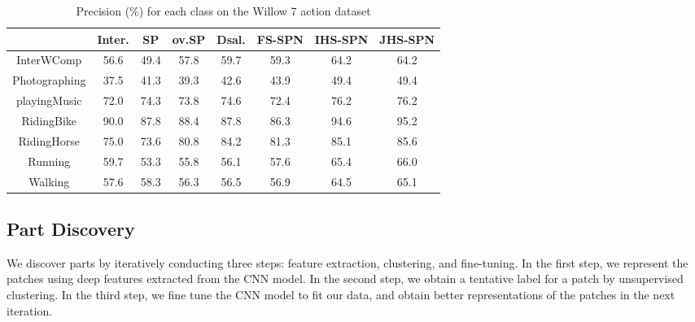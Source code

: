\documentclass[journal]{IEEEtran}
\begin{document}
\begin{table*}[htb]
    \caption{Precision (\%) for each class on the Willow 7 action dataset}   
        
    \begin{center}
        
        \begin{tabular}{c c c c c c c c}
            \hline                        
            \hline
             & Inter.\cite{Delaitre11learningperson-object} &  SP\cite{Lazebnik_beyond_cvpr2006} & ov.SP\cite{Lazebnik_beyond_cvpr2006}  & Dsal.\cite{sharma:CVPR2012_Discriminative}  & FS-SPN & IHS-SPN & JHS-SPN \\ \hline
               InterWComp & 56.6 & 49.4 & 57.8 & 59.7 & 59.3 & 64.2 & 64.2\\
            Photographing & 37.5 &  41.3 & 39.3 & 42.6 & 43.9 & 49.4 & 49.4\\
            playingMusic & 72.0 & 74.3 & 73.8 & 74.6 & 72.4 & 76.2 & 76.2\\
            RidingBike & 90.0 & 87.8 & 88.4 & 87.8 & 86.3 & 94.6 & 95.2\\
            RidingHorse & 75.0 & 73.6 & 80.8 & 84.2 & 81.3 & 85.1 & 85.6\\
            Running & 59.7 &  53.3 & 55.8 & 56.1 & 57.6 & 65.4 & 66.0\\
            Walking & 57.6 & 58.3 & 56.3 & 56.5 & 56.9 & 64.5 & 65.1\\
            \hline
                        
                        \hline
       \end{tabular}
        
    \end{center}
    
    
    \label{tab:class_willow_accuracy} 
\end{table*}









\subsection{Part Discovery}

We discover parts by iteratively conducting three steps: feature extraction, clustering, and fine-tuning. In the first step, we represent the patches using deep features extracted from the CNN model. In the second step, we obtain a tentative label for a patch by unsupervised clustering. In the third step, we fine tune the CNN model to fit our data, and obtain better representations of the patches in the next iteration.
\end{document}
